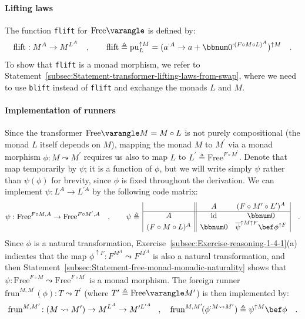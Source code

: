 \paragraph{Lifting laws}

The function \lstinline!flift! for $\text{Free}\varangle$ is defined
by:
\[
\text{flift}:M^{A}\rightarrow M^{L^{A}}\quad,\quad\quad\text{flift}\triangleq\text{pu}_{L}^{\uparrow M}=(a^{:A}\rightarrow a+\bbnum 0^{:(F\circ M\circ L)^{A}})^{\uparrow M}\quad.
\]
To show that \lstinline!flift! is a monad morphism, we refer to Statement~\ref{subsec:Statement-transformer-lifting-laws-from-swap},
where we need to use \lstinline!blift! instead of \lstinline!flift!
and exchange the monads $L$ and $M$.

\paragraph{Implementation of runners}

Since the transformer $\text{Free}\varangle M=M\circ L$ is not purely
compositional (the monad $L$ itself depends on $M$), mapping the
monad $M$ to $M^{\prime}$ via a monad morphism $\phi:M\leadsto M^{\prime}$
requires us also to map $L$ to $L^{\prime}\triangleq\text{Free}^{F\circ M^{\prime}}$.
Denote that map temporarily by $\psi$; it is a function of $\phi$,
but we will write simply $\psi$ rather than $\psi(\phi)$ for brevity,
since $\phi$ is fixed throughout the derivation. We can implement
$\psi:L^{A}\rightarrow L^{\prime A}$ by the following code matrix:
\begin{equation}
\psi:\text{Free}^{F\circ M,A}\rightarrow\text{Free}^{F\circ M^{\prime},A}\quad,\quad\quad\psi\triangleq\,\begin{array}{|c||cc|}
 & A & (F\circ M^{\prime}\circ L^{\prime})^{A}\\
\hline A & \text{id} & \bbnum 0\\
(F\circ M\circ L)^{A} & \bbnum 0 & \overline{\psi}^{\uparrow M\uparrow F}\bef\phi^{\uparrow F}
\end{array}\quad.\label{eq:free-monad-definition-of-psi}
\end{equation}
Since $\phi$ is a natural transformation, Exercise~\ref{subsec:Exercise-reasoning-1-4-1}(a)
indicates that the map $\phi^{\uparrow F}:F^{M^{A}}\leadsto F^{M^{\prime A}}$
is also a natural transformation, and then Statement~\ref{subsec:Statement-free-monad-monadic-naturality}
shows that $\psi:\text{Free}^{F\circ M}\leadsto\text{Free}^{F\circ M^{\prime}}$
is a monad morphism. The foreign runner $\text{frun}^{M,M^{\prime}}(\phi):T\leadsto T^{\prime}$
(where $T^{\prime}\triangleq\text{Free}\varangle M^{\prime}$) is
then implemented by:
\[
\text{frun}^{M,M^{\prime}}\!:\left(M\leadsto M^{\prime}\right)\rightarrow M^{L^{A}}\rightarrow M^{\prime L^{\prime A}}\!\quad,\quad\text{frun}^{M,M^{\prime}}\!(\phi^{:M\leadsto M^{\prime}})\triangleq\psi^{\uparrow M}\bef\phi\quad.
\]

